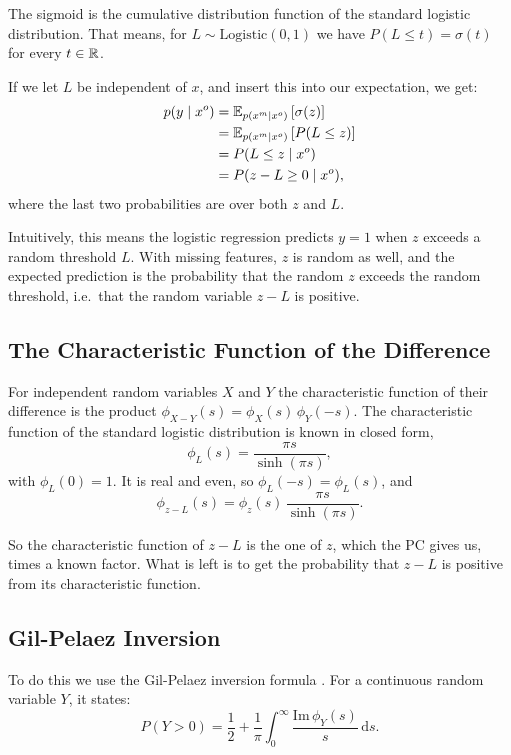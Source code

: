 The sigmoid is the cumulative distribution function of the standard logistic distribution. That means, for
$L \sim \mathrm{Logistic}(0, 1)$ we have $P(L \leq t) = \sigma(t)$ for every $t \in \mathbb{R}$.

If we let $L$ be independent of $x$, and insert this into our expectation, we get:
\begin{align*}
  p(y \mid x^o)
  &= \mathbb{E}_{p(x^m \mid x^o)} \left[ \sigma(z) \right] \\
  &= \mathbb{E}_{p(x^m \mid x^o)} \left[ P(L \leq z) \right] \\
  &= P(L \leq z \mid x^o) \\
  &= P(z - L \geq 0 \mid x^o),
\end{align*}
where the last two probabilities are over both $z$ and $L$.

Intuitively, this means the logistic regression predicts $y = 1$ when $z$ exceeds a random threshold $L$.
With missing features, $z$ is random as well, and the expected prediction is the probability that the random $z$
exceeds the random threshold, i.e.\ that the random variable $z - L$ is positive.

\subsection{The Characteristic Function of the Difference}

For independent random variables $X$ and $Y$ the characteristic function of their difference is the product
$\phi_{X - Y}(s) = \phi_X(s)\, \phi_Y(-s)$. The characteristic function of the standard logistic distribution is
known in closed form,
\[
  \phi_L(s) = \frac{\pi s}{\sinh(\pi s)},
\]
with $\phi_L(0) = 1$. It is real and even, so $\phi_L(-s) = \phi_L(s)$, and
\[
  \phi_{z - L}(s) = \phi_z(s)\, \frac{\pi s}{\sinh(\pi s)}.
\]

So the characteristic function of $z - L$ is the one of $z$, which the PC gives us, times a known factor.
What is left is to get the probability that $z - L$ is positive from its characteristic function.

\subsection{Gil-Pelaez Inversion}

To do this we use the Gil-Pelaez inversion formula \cite{gilpelaez1951}. For a continuous random variable $Y$, it states:
\begin{equation}
  P(Y > 0) = \frac{1}{2} + \frac{1}{\pi} \int_0^\infty \frac{\mathrm{Im}\, \phi_Y(s)}{s} \, \mathrm{d}s.
\end{equation}

